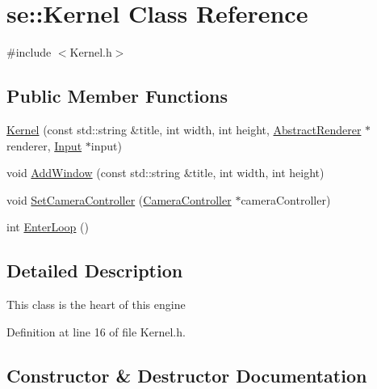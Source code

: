 \hypertarget{classse_1_1_kernel}{}\section{se\+:\+:Kernel Class Reference}
\label{classse_1_1_kernel}


{\ttfamily \#include $<$Kernel.\+h$>$}

\subsection*{Public Member Functions}
\begin{DoxyCompactItemize}
\item 
\mbox{\hyperlink{classse_1_1_kernel_a28fa4e75a4f693d01e96f63849d9cf15}{Kernel}} (const std\+::string \&title, int width, int height, \mbox{\hyperlink{classse_1_1_abstract_renderer}{Abstract\+Renderer}} $\ast$renderer, \mbox{\hyperlink{classse_1_1_input}{Input}} $\ast$input)
\item 
void \mbox{\hyperlink{classse_1_1_kernel_aafcef2223ca597327876f4f444d3521b}{Add\+Window}} (const std\+::string \&title, int width, int height)
\item 
void \mbox{\hyperlink{classse_1_1_kernel_a60a807b4f4e928752e7512f5b7b4a17c}{Set\+Camera\+Controller}} (\mbox{\hyperlink{classse_1_1_camera_controller}{Camera\+Controller}} $\ast$camera\+Controller)
\item 
int \mbox{\hyperlink{classse_1_1_kernel_a1faeac6fce02ccd7ff76d94ad78e0754}{Enter\+Loop}} ()
\end{DoxyCompactItemize}


\subsection{Detailed Description}
This class is the heart of this engine 

Definition at line 16 of file Kernel.\+h.



\subsection{Constructor \& Destructor Documentation}
\mbox{\label{classse_1_1_kernel_a28fa4e75a4f693d01e96f63849d9cf15}} 
